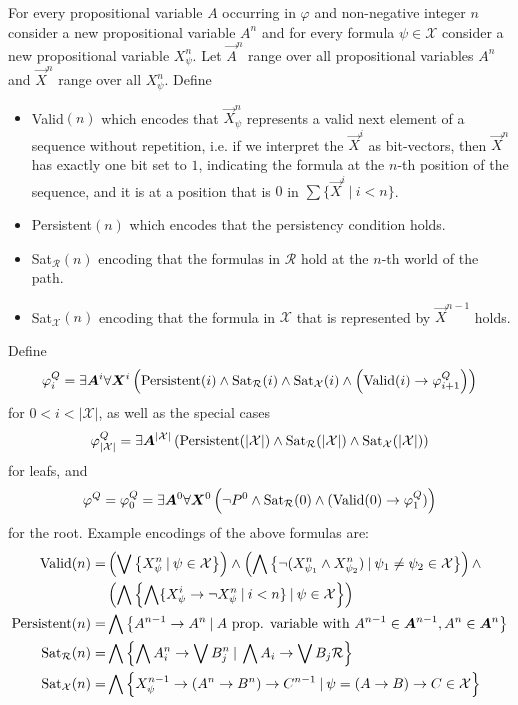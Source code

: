 \documentclass[runningheads]{llncs}
\begin{document}
\begin{definition}
	For every propositional variable $A$ occurring in $\varphi$ and non-negative integer $n$ consider a new propositional variable $A^n$ and for every formula $\psi\in\mathcal X$ consider a new propositional variable $X_\psi^n$. Let $\vec A^n$ range over all propositional variables $A^n$ and $\vec X^n$ range over all $X_\psi^n$. Define
	\begin{itemize}
		\item {\normalfont Valid}$(n)$ which encodes that $\vec X^n_\psi$ represents a valid next element of a sequence without repetition, i.e. if we interpret the $\vec X^i$ as bit-vectors, then $\vec X^n$ has exactly one bit set to $1$, indicating the formula at the $n$-th position of the sequence, and it is at a position that is $0$ in $\sum\{\vec X^i\:|\:i < n\}$.
		\item {\normalfont Persistent}$(n)$ which encodes that the persistency condition holds.
		\item {\normalfont Sat}$_{\mathcal R}(n)$ encoding that the formulas in $\mathcal R$ hold at the $n$-th world of the path.
		\item {\normalfont Sat}$_{\mathcal X}(n)$ encoding that the formula in $\mathcal X$ that is represented by $\vec X^{n-1}$ holds.
	\end{itemize}
	Define$$\varphi^Q_{i} = \exists \vec A^i\forall \vec X^i\left(\text{\normalfont Persistent}(i)\wedge \text{\normalfont Sat}_{\mathcal R}(i)\wedge \text{\normalfont Sat}_{\mathcal X}(i)\wedge\left(\text{\normalfont Valid}(i)\to \varphi^Q_{i+1}\right)\right)$$
	for $0 < i < |\mathcal{X}|$, as well as the special cases
	$$\varphi^Q_{|\mathcal{X}|} = \exists \vec A^{|\mathcal{X}|}\left(\text{\normalfont Persistent}(|\mathcal{X}|)\wedge \text{\normalfont Sat}_{\mathcal R}(|\mathcal{X}|)\wedge \text{\normalfont Sat}_{\mathcal X}(|\mathcal{X}|)\right)$$
	for leafs, and $$\varphi^Q = \varphi_0^Q = \exists \vec A^0\forall \vec X^0\left(\neg P^0\wedge \text{\normalfont Sat}_{\mathcal R}(0)\wedge(\text{\normalfont Valid}(0)\to \varphi_1^Q)\right)$$for the root.
	Example encodings of the above formulas are:
	\begin{align*}
		\text{\normalfont Valid}(n) = &\left(\bigvee\left\{X^n_\psi\:|\:\psi\in\mathcal X\right\}\right)\wedge\left(\bigwedge \left\{\neg(X^n_{\psi_1}\wedge X^n_{\psi_2})\:|\:\psi_1\neq\psi_2\in\mathcal X\right\}\right)\wedge\\&\left(\bigwedge\left\{\bigwedge\{X^i_\psi\to\neg X^n_\psi\:|\:i < n\}\:|\:\psi\in\mathcal X\right\}\right)\\
		\text{\normalfont Persistent}(n) = & \bigwedge\left\{A^{n-1}\to A^n\:|\: A \text{ prop. variable with }A^{n-1}\in\vec A^{n-1}, A^n \in\vec A^{n}\right\}\\
		\text{\normalfont Sat}_{\mathcal R}(n) = &\bigwedge\left\{\bigwedge A^n_i\to\bigvee B^n_j\:|\:\bigwedge A_i\to\bigvee B_j\mathcal R\right\}\\
		\text{\normalfont Sat}_{\mathcal X}(n) = & \bigwedge\left\{X^{n-1}_\psi\to (A^n\to B^n)\to C^{n-1}\:|\:\psi = (A\to B)\to C\in\mathcal X\right\}
	\end{align*}
\end{definition}
\end{document}

